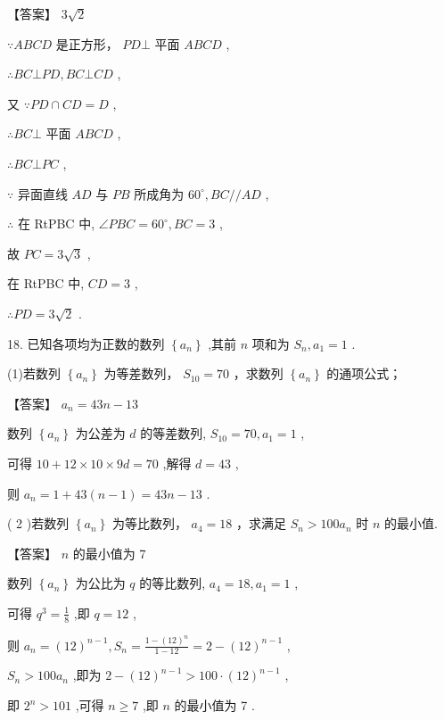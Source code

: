 \documentclass[10pt]{article}
\begin{document}
【答案】 \(3\sqrt{2}\)

\(\because {ABCD}\) 是正方形， \({PD} \bot\) 平面 \({ABCD}\) ,

\(\therefore {BC} \bot  {PD},{BC} \bot  {CD}\) ,

又 \(\because {PD} \cap  {CD} = D\) ,

\(\therefore {BC} \bot\) 平面 \({ABCD}\) ,

\(\therefore {BC} \bot  {PC}\) ,

\(\because\) 异面直线 \({AD}\) 与 \({PB}\) 所成角为 \({60}^{ \circ  },{BC}//{AD}\) ,

\(\therefore\) 在 RtPBC 中, \(\angle {PBC} = {60}^{ \circ  },{BC} = 3\) ,

故 \({PC} = 3\sqrt{3}\) ,

在 RtPBC 中, \({CD} = 3\) ,

\(\therefore {PD} = 3\sqrt{2}\) .

18. 已知各项均为正数的数列 \(\left\{  {a}_{n}\right\}\) ,其前 \(n\) 项和为 \({S}_{n},{a}_{1} = 1\) .

(1)若数列 \(\left\{  {a}_{n}\right\}\) 为等差数列， \({S}_{10} = {70}\) ，求数列 \(\left\{  {a}_{n}\right\}\) 的通项公式；

【答案】 \({a}_{n} = {43n} - {13}\)

数列 \(\left\{  {a}_{n}\right\}\) 为公差为 \(d\) 的等差数列, \({S}_{10} = {70},{a}_{1} = 1\) ,

可得 \({10} + {12} \times  {10} \times  {9d} = {70}\) ,解得 \(d = {43}\) ,

则 \({a}_{n} = 1 + {43}\left( {n - 1}\right)  = {43n} - {13}\) .

( 2 )若数列 \(\left\{  {a}_{n}\right\}\) 为等比数列， \({a}_{4} = {18}\) ，求满足 \({S}_{n} > {{100}{a}_{n}}\) 时 \(n\) 的最小值.

【答案】 \(n\) 的最小值为 7

数列 \(\left\{  {a}_{n}\right\}\) 为公比为 \(q\) 的等比数列, \({a}_{4} = {18},{a}_{1} = 1\) ,

可得 \({q}^{3} = \frac{1}{8}\) ,即 \(q = {12}\) ,

则 \({a}_{n} = {\left( {12}\right) }^{n - 1},{S}_{n} = \frac{1 - {\left( {12}\right) }^{n}}{1 - {12}} = 2 - {\left( {12}\right) }^{n - 1}\) ,

\({S}_{n} > {100}{a}_{n}\) ,即为 \(2 - {\left( {12}\right) }^{n - 1} > {100} \cdot  {\left( {12}\right) }^{n - 1}\) ,

即 \({2}^{n} > {101}\) ,可得 \(n \geq  7\) ,即 \(n\) 的最小值为 7 .
\end{document}
